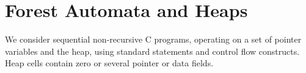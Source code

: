 {%
%
%
%
%
\section{Forest Automata and Heaps}


We consider sequential non-recursive C programs, operating on a set of pointer
variables and the heap, using standard statements and control flow constructs.
Heap cells contain zero or several pointer or data fields.

}
